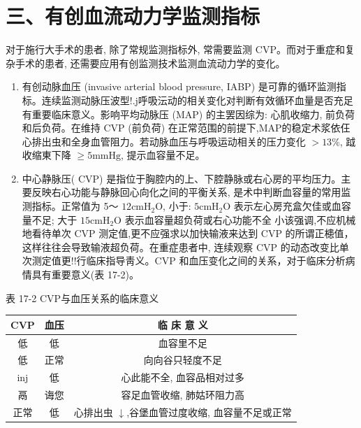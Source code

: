 \documentclass[10pt]{article}
\begin{document}
\section*{三、有创血流动力学监测指标}
对于施行大手术的患者, 除了常规监测指标外, 常需要监测 CVP。而对于重症和复杂手术的患者, 还需要应用有创监测技术监测血流动力学的变化。

\begin{enumerate}
  \item 有创动脉血压 (invasive arterial blood pressure, IABP) 是可靠的循环监测指标。连续监测动脉压波型!.j呼吸沄动的相关变化对判断有效循环血量是否充足有重要临床意义。影响平均动脉压 (MAP) 的主罢因综为: 心肌收缩力, 前负荷和后负荷。在维持 CVP (前负荷) 在正常范围的前提下,MAP的稳定术浆依仼心排出虫和全身血管阻力。若动脉血压与呼吸运动相关的压力变化 $>13 \%$, 䟠收缩東下降 $\geqslant 5 \mathrm{mmHg}$, 提示血容量不足。

  \item 中心静脉压( CVP) 是指位于胸腔内的上、下腔静脉或右心房的平均压力。主要反映右心功能与静脉回心向化之间的平衡关系, 是术中判断血容量的常用监测指标。正常值为 5～ $12 \mathrm{cmH}_{2} \mathrm{O}$, 小于: $5 \mathrm{cmH}_{2} \mathrm{O}$ 表示左心房充盒欠佳或血容量不足; 大于 $15 \mathrm{cmH}_{2} \mathrm{O}$ 表示血容量超负荷或右心功能不全 小该强调,不应机械地看待单次 CVP 测定值,更不应强求以加快输液来达到 CVP 的所谓正槵值，这样往往会导致输液超负荷。在重症患者中, 连续观察 CVP 的动态改变比单次测定值更!!行临床指导靑义。CVP 和血压变化之间的关系，对于临床分析病情具有重要意义(表 17-2)。

\end{enumerate}

表 17-2 CVP与血压关系的临床意义

\begin{center}
\begin{tabular}{|c|c|c|}
\hline
CVP & 血压 & 临 床 意 义 \\
\hline
低 & 低 & 血容里不足 \\
\hline
低 & 正常 & 向向谷只轻度不足 \\
\hline
inj & 低 & 心此能不全, 血容品相对过多 \\
\hline
鬲 & 诲您 & 容足血管收缩, 肺姑环阻力高 \\
\hline
正常 & 低 & 心排出虫 $\downarrow$,谷堡血管过度收缩, 血容量不足或正常 \\
\hline
\end{tabular}
\end{center}
\end{document}
